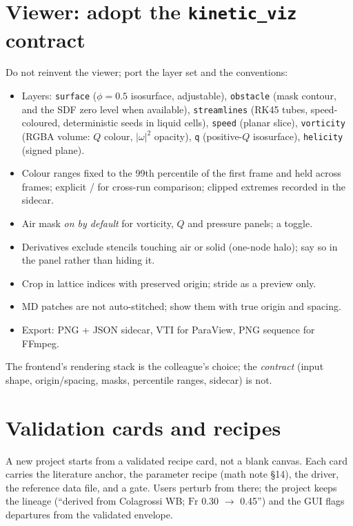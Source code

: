 \documentclass[11pt,a4paper]{article}
\newcommand{\Fr}{\mathrm{Fr}}
\newcommand{\code}[1]{\texttt{#1}}
\begin{document}
\section{Viewer: adopt the \code{kinetic\_viz} contract}\label{sec:viewer}
Do not reinvent the viewer; port the layer set and the conventions:
\begin{itemize}
\item Layers: \code{surface} ($\phi=0.5$ isosurface, adjustable), \code{obstacle}
  (mask contour, and the SDF zero level when available), \code{streamlines} (RK45
  tubes, speed-coloured, deterministic seeds in liquid cells), \code{speed} (planar
  slice), \code{vorticity} (RGBA volume: $Q$ colour, $|\omega|^2$ opacity), \code{q}
  (positive-$Q$ isosurface), \code{helicity} (signed plane).
\item Colour ranges fixed to the 99th percentile of the first frame and held across
  frames; explicit  /  for cross-run comparison;
  clipped extremes recorded in the sidecar.
\item Air mask \emph{on by default} for vorticity, $Q$ and pressure panels; a toggle.
\item Derivatives exclude stencils touching air or solid (one-node halo); say so in the
  panel rather than hiding it.
\item Crop in lattice indices with preserved origin; stride as a preview only.
\item MD patches are not auto-stitched; show them with true origin and spacing.
\item Export: PNG + JSON sidecar, VTI for ParaView, PNG sequence for FFmpeg.
\end{itemize}
The frontend's rendering stack is the colleague's choice; the \emph{contract}
(input shape, origin/spacing, masks, percentile ranges, sidecar) is not.

\section{Validation cards and recipes}\label{sec:recipes}
A new project starts from a validated recipe card, not a blank canvas. Each card
carries the literature anchor, the parameter recipe (math note \S14), the driver,
the reference data file, and a gate. Users perturb from there; the project keeps the
lineage (``derived from Colagrossi WB; $\Fr$ 0.30 $\to$ 0.45'') and the GUI flags
departures from the validated envelope.
\end{document}

